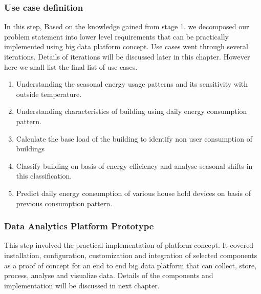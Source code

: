 \subsubsection{Use case definition} 
In this step, Based on the knowledge gained from stage 1. we decomposed our problem statement into lower level requirements that can be practically implemented using big data platform concept. Use cases went through several iterations. Details of iterations will be discussed later in this chapter. However here we shall list the final list of use cases.
\begin{enumerate}
\item Understanding the seasonal energy usage patterns and its sensitivity with outside temperature.
\item Understanding characteristics of building using daily energy consumption pattern.
\item Calculate the base load of the building to identify non user consumption of buildings
\item Classify building on basis of energy efficiency and analyse seasonal shifts in this classification.
\item Predict daily energy consumption of various house hold devices on basis of previous consumption pattern.
\end{enumerate}
\subsubsection{Data Analytics Platform Prototype}
This step involved the practical implementation of platform concept. It covered installation, configuration, customization and integration of selected components as a proof of concept for an end to end big data platform that can collect, store, process, analyse and visualize data. Details of the components and implementation will be discussed in next chapter.
